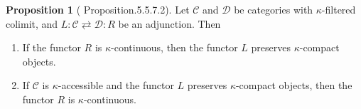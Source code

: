 \documentclass[a4paper,dvipdfmx,11pt,reqno]{amsart}
\newcommand{\C}{\mathcal{C}}
\newcommand{\D}{\mathcal{D}}
\newcommand{\CAT}{\mathrm{CAT}}
\newcommand{\PrL}{\mathrm{Pr}^{\mathrm{L}}}
\theoremstyle{definition}
\newtheorem{definition}[theorem]{Definition}
\newtheorem{notation}[theorem]{Notation}
\newtheorem{proposition}[theorem]{Proposition}
\begin{document}
\begin{proposition}[\cite{HTT} Proposition.5.5.7.2]
  Let $\C$ and $\D$ be categories with $\kappa$-filtered colimit, and $L : \C \rightleftarrows \D : R$ be an adjunction.
  Then 
  \begin{enumerate}
    \item If the functor $R$ is $\kappa$-continuous, then the functor $L$ preserves $\kappa$-compact objects.
    \item If $\C$ is $\kappa$-accessible and the functor $L$ preserves $\kappa$-compact objects, then the functor $R$ is $\kappa$-continuous.
  \end{enumerate}
\end{proposition}







  
\end{document}
